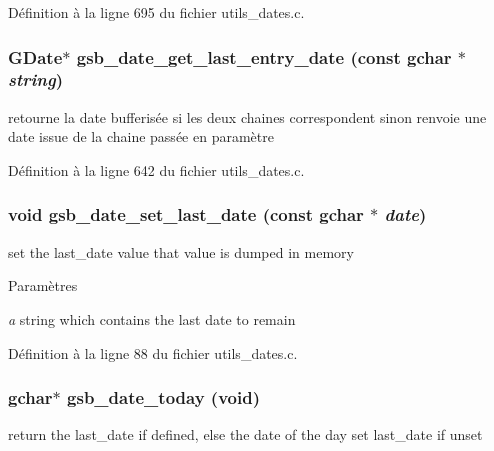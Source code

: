 Définition à la ligne 695 du fichier utils\_\-dates.c.

\subsubsection[{gsb\_\-date\_\-get\_\-last\_\-entry\_\-date}]{\setlength{\rightskip}{0pt plus 5cm}GDate$\ast$ gsb\_\-date\_\-get\_\-last\_\-entry\_\-date (const gchar $\ast$ {\em string})}\label{utils__dates_8c_a60657a1332e700eeb88b1fc59ee2d25c}
retourne la date bufferisée si les deux chaines correspondent sinon renvoie une date issue de la chaine passée en paramètre 

Définition à la ligne 642 du fichier utils\_\-dates.c.

\subsubsection[{gsb\_\-date\_\-set\_\-last\_\-date}]{\setlength{\rightskip}{0pt plus 5cm}void gsb\_\-date\_\-set\_\-last\_\-date (const gchar $\ast$ {\em date})}\label{utils__dates_8c_aaac40b10a45d7e5d71c519b5d4755311}
set the last\_\-date value that value is dumped in memory


\begin{DoxyParams}{Paramètres}
\item[{\em a}]string which contains the last date to remain \end{DoxyParams}


Définition à la ligne 88 du fichier utils\_\-dates.c.

\subsubsection[{gsb\_\-date\_\-today}]{\setlength{\rightskip}{0pt plus 5cm}gchar$\ast$ gsb\_\-date\_\-today (void)}\label{utils__dates_8c_af4555330ab5823ec03ff9388cca24e58}
return the last\_\-date if defined, else the date of the day set last\_\-date if unset


